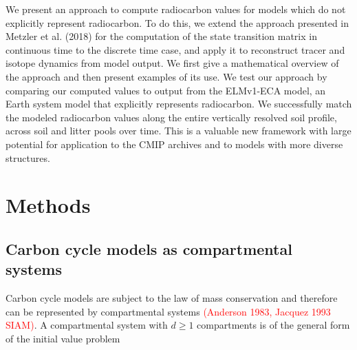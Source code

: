 \documentclass[11pt,a4paper]{article}
\newcommand{\red}[1]{\textcolor{red}{#1}}
\begin{document}
We present an approach to compute radiocarbon values for models which do not explicitly represent radiocarbon. To do this, we extend the approach presented in Metzler et al. (2018) for the computation of the state transition matrix in continuous time to the discrete time case, and apply it to reconstruct tracer and isotope dynamics from model output. We first give a mathematical overview of the approach and then present examples of its use. We test our approach by comparing our computed values to output from the ELMv1-ECA model, an Earth system model that explicitly represents radiocarbon. We successfully match the modeled radiocarbon values along the entire vertically resolved soil profile, across soil and litter pools over time. This is a valuable new framework with large potential for application to the CMIP archives and to models with more diverse structures. 

\section{Methods}



\subsection*{Carbon cycle models as compartmental systems}
    Carbon cycle models are subject to the law of mass conservation and therefore can be represented by compartmental systems \red{(Anderson 1983, Jacquez 1993 SIAM)}.
    A compartmental system with $d\geq1$ compartments is of the general form of the initial value problem
    
\end{document}

